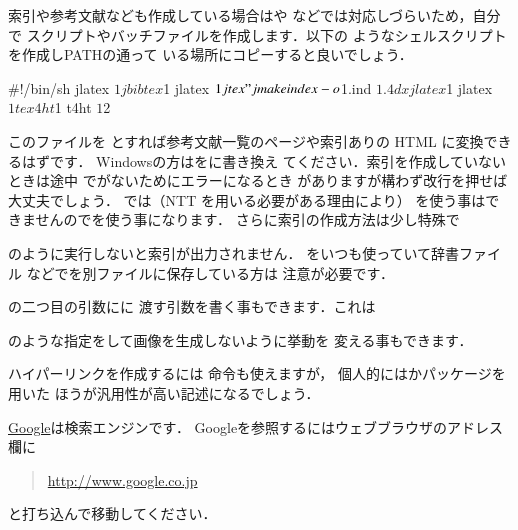 \begin{Trick}
索引や参考文献なども作成している場合はや
などでは対応しづらいため，自分で
スクリプトやバッチファイルを作成します．以下の
ようなシェルスクリプトを作成しPATHの通って
いる場所にコピーすると良いでしょう．

\begin{InText}
#!/bin/sh
jlatex $1 
jbibtex $1  
jlatex $1 
jtex "\def\filename{{$1}{idx}{4dx}{ind}}  
jmakeindex -o $1.ind  $1.4dx 
jlatex $1 
jlatex $1 
tex4ht $1 
t4ht $1 $2
\end{InText}

このファイルを
とすれば参考文献一覧のページや索引ありの HTML に変換できるはずです．
 Windowsの方はをに書き換え
てください．索引を作成していないときは途中
でがないためにエラーになるとき
がありますが構わず改行を押せば大丈夫でしょう．
では（NTT \JTeX を用いる必要がある理由により）
を使う事はできませんのでを使う事になります．
さらに索引の作成方法は少し特殊で
のように実行しないと索引が出力されません．
をいつも使っていて辞書ファイル
などでを別ファイルに保存している方は
注意が必要です．
\end{Trick}


の二つ目の引数にに
渡す引数を書く事もできます．これは
\begin{InTerm}
\end{InTerm}
のような指定をして画像を生成しないように挙動を
変える事もできます．

ハイパーリンクを作成するには 命令も使えますが，
個人的にはかパッケージを用いた
ほうが汎用性が高い記述になるでしょう．

\begin{InTeX}
\usepackage[html,charset=Shift_JIS]{tex4ht}
\usepackage[tex4th]{hyperref}
\href{http://www.google.co.jp}{Google}は検索エンジンです．
Googleを参照するにはウェブブラウザのアドレス欄に
 \begin{quote}
  \url{http://www.google.co.jp} 
 \end{quote}
と打ち込んで移動してください．
\end{InTeX}

